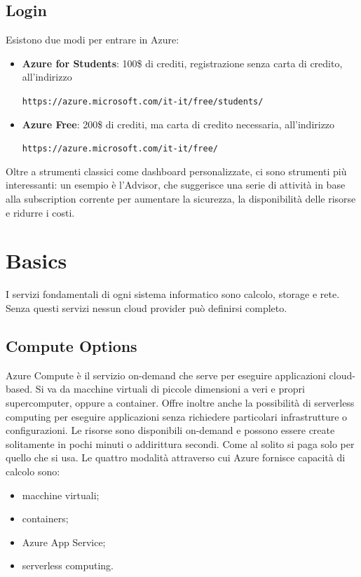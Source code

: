 \subsection{Login}
Esistono due modi per entrare in Azure:
\begin{itemize}
    \item \textbf{Azure for Students}: 100\$ di crediti, registrazione senza carta di credito, all'indirizzo 
    
    \texttt{https://azure.microsoft.com/it-it/free/students/}
    \item \textbf{Azure Free}: 200\$ di crediti, ma carta di credito necessaria, all'indirizzo
    
    \texttt{https://azure.microsoft.com/it-it/free/}
\end{itemize}
Oltre a strumenti classici come dashboard personalizzate, ci sono strumenti più interessanti: un esempio è l'Advisor, che suggerisce una serie di attività in base alla subscription corrente per aumentare la sicurezza, la disponibilità delle risorse e ridurre i costi.

\section{Basics}
I servizi fondamentali di ogni sistema informatico sono calcolo, storage e rete. Senza questi servizi nessun cloud provider può definirsi completo.

\subsection{Compute Options}
Azure Compute è il servizio on-demand che serve per eseguire applicazioni cloud-based. Si va da macchine virtuali di piccole dimensioni a veri e propri supercomputer, oppure a container.
Offre inoltre anche la possibilità di serverless computing per eseguire applicazioni senza richiedere particolari infrastrutture o configurazioni. Le risorse sono disponibili on-demand e possono essere create solitamente in pochi minuti o addirittura secondi. Come al solito si paga solo per quello che si usa. Le quattro modalità attraverso cui Azure fornisce capacità di calcolo sono:
\begin{itemize}
    \item macchine virtuali;
    \item containers;
    \item Azure App Service;
    \item serverless computing.
\end{itemize}

